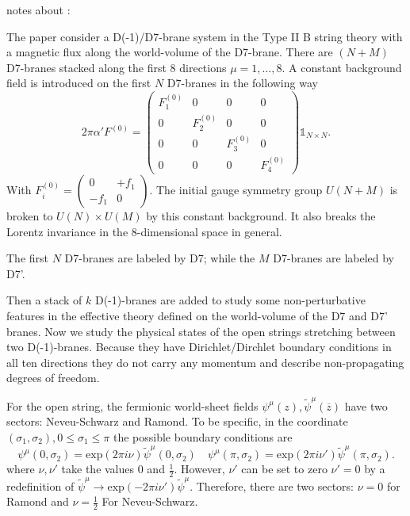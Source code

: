 
notes about :

The paper consider a D(-1)/D7-brane system in the Type II B string theory
with a magnetic flux along the world-volume of the D7-brane.
There are $(N+M)$ D7-branes stacked along the first $8$ directions
$\mu = 1,\dots,8$.
A constant background field is introduced on the first $N$ D7-branes in the following way
\[
	2 \pi \alpha' F^{(0)} = \begin{pmatrix} F_1^{(0)} & 0 & 0 & 0 \\
		0 & F_2^{(0)} & 0 & 0 \\
		0 & 0 & F_3^{(0)} & 0 \\
	0 & 0 & 0 & F_4^{(0)} \end{pmatrix} \mathds{1}_{N\times N}
.\] 
With $ F_i^{(0)} = \begin{pmatrix} 0 & + f_1 \\ - f_1 & 0 \end{pmatrix}$.
The initial gauge symmetry group $U(N+M)$ is broken to $U(N)\times U(M)$
by this constant background.
It also breaks the Lorentz invariance in the $8$-dimensional space in general.

The first $N$ D7-branes are labeled by D7;
while the $M$ D7-branes are labeled by D7'.

Then a stack of $k$ D(-1)-branes are added
to study some non-perturbative features in the effective theory
defined on the world-volume of the D7 and D7' branes.
Now we study the physical states of the open strings
stretching between two D(-1)-branes.
Because they have Dirichlet/Dirchlet boundary conditions in all ten directions
they do not carry any momentum and describe non-propagating degrees of freedom.

For the open string, the fermionic world-sheet fields $\psi^\mu (z), \tilde{\psi}^\mu (\overline{z})$ have two sectors: Neveu-Schwarz and Ramond.
To be specific, in the coordinate $(\sigma_1,\sigma_2),0\leq\sigma_1\leq\pi$
the possible boundary conditions are
\begin{equation}
	\psi^\mu (0,\sigma_2) = \mathrm{exp}(2\pi i \nu) \tilde{\psi}^\mu(0,\sigma_2)
	\quad
	\psi^\mu (\pi,\sigma_2) = \mathrm{exp} (2\pi i \nu') \tilde{\psi}^\mu (\pi,\sigma_2).
\end{equation}
where $\nu,\nu'$ take the values $0$ and $\frac{1}{2}$.
However, $\nu'$ can be set to zero $\nu'=0$
by a redefinition of $\tilde{\psi}^\mu \to \mathrm{exp}(-2\pi i\nu')\tilde{\psi}^\mu$.
Therefore, there are two sectors: $\nu=0$ for Ramond and $\nu=\frac{1}{2}$ For Neveu-Schwarz.

